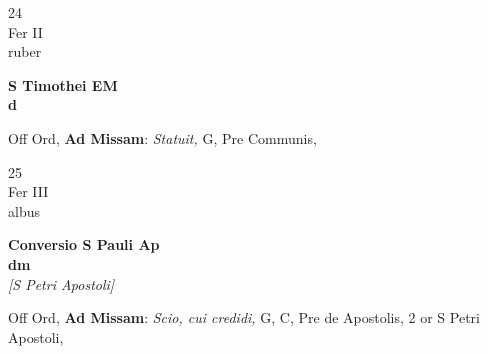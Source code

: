 \documentclass[10pt, openany]{book}
\begin{document}
        \begin{center}
            \begin{minipage}{3.5in}
                \vspace{2em}
                \begin{minipage}{0.5in}
                    {\Huge 24} \\
                    {\normalsize Fer II} \\
                    {\normalsize ruber}
                \end{minipage}
                \begin{minipage}{3.0in}
                    \textbf{ \large S Timothei EM \\
                    \textnormal{\normalsize d}} \\ 
                \end{minipage}
                \begin{justify}Off Ord, \textbf{Ad Missam}: \textit{Statuit,} G, Pre Communis,   
                \end{justify}
            \end{minipage}
        \end{center}
    
        \begin{center}
            \begin{minipage}{3.5in}
                \vspace{2em}
                \begin{minipage}{0.5in}
                    {\Huge 25} \\
                    {\normalsize Fer III} \\
                    {\normalsize albus}
                \end{minipage}
                \begin{minipage}{3.0in}
                    \textbf{ \large Conversio S Pauli Ap \\
                    \textnormal{\normalsize dm}} \\ \textit{[S Petri Apostoli]} \\ 
                \end{minipage}
                \begin{justify}Off Ord, \textbf{Ad Missam}: \textit{Scio, cui credidi,} G, C, Pre de Apostolis, 2 or S Petri Apostoli,   
                \end{justify}
            \end{minipage}
        \end{center}
    
\end{document}
